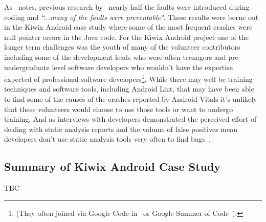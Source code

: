 As~\citep{kidwell2015_toward_fault_taxonomy_application_of_software_analytics} notes, previous research by~\citep{weider1998_software_fault_prevention_in_coding_and_RCA} nearly half the faults were introduced during coding and \emph{``...many of the faults were preventable"}. These results were borne out in the Kiwix Android case study where some of the most frequent crashes were null pointer errors in the Java code. For the Kiwix Android project one of the longer term challenges was the youth of many of the volunteer contributors including some of the development leads who were often teenagers and pre-undergraduate level software developers who wouldn't have the expertise expected of professional software developers\footnote{(They often joined via Google Code-in~\citep{google_code_in_archive} or Google Summer of Code~\citep{google_summer_of_code}).}. While there may well be training techniques and software tools, including Android Lint, that may have been able to find some of the causes of the crashes reported by Android Vitals it's unlikely that these volunteers would choose to use those tools or want to undergo training. And as interviews with developers demonstrated the perceived effort of dealing with static analysis reports and the volume of false positives mean developers don't use static analysis tools very often to find bugs~\citep{johnson2013_why_dont_devs_use_static_analysis}.

\subsection{Summary of Kiwix Android Case Study}
TBC
